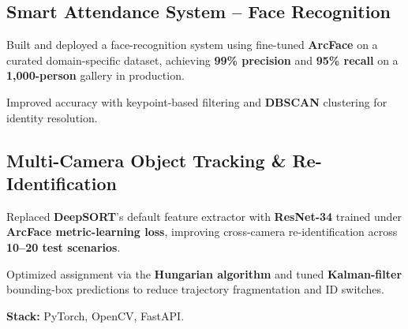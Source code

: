 \documentclass[letter,10pt]{article}
\begin{document}
\subsection{Smart Attendance System -- Face Recognition}
\begin{zitemize}
\item Built and deployed a face-recognition system using fine-tuned \textbf{ArcFace} on a curated domain-specific dataset, achieving \textbf{99\% precision} and \textbf{95\% recall} on a \textbf{1{,}000-person} gallery in production.
\item Improved accuracy with keypoint-based filtering and \textbf{DBSCAN} clustering for identity resolution.
\end{zitemize}

\subsection{Multi-Camera Object Tracking \& Re-Identification}
\begin{zitemize}
\item Replaced \textbf{DeepSORT}'s default feature extractor with \textbf{ResNet-34} trained under \textbf{ArcFace metric-learning loss}, improving cross-camera re-identification across \textbf{10--20 test scenarios}.
\item Optimized assignment via the \textbf{Hungarian algorithm} and tuned \textbf{Kalman-filter} bounding-box predictions to reduce trajectory fragmentation and ID switches.
\item \textbf{Stack:} PyTorch, OpenCV, FastAPI.
\end{zitemize}
\end{document}
